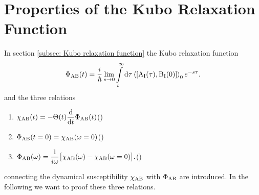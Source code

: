 %
%
\chapter{Properties of the Kubo Relaxation Function}
\label{app:properties of the Kubo relaxation function}
%
%
In section \ref{subsec: Kubo relaxation function} the Kubo relaxation function 
%
\begin{align}
	\Phi_{\mt{AB}}(t) = \frac{i}{\hbar} \lim\limits_{s \to 0} \int\limits_{t}^{\infty} \dd{\tau} \expval{\comm{\mt{A}_{\mt{I}}(\tau)}{\mt{B}_{\mt{I}}(0)}}_{0} e^{-s\tau}.
	\label{appeq: Kubo relaxation function}
\end{align}
%
and the three relations 
%
\begin{enumerate}
	\item $\begin{aligned}[t] \chi_{\mathrm{AB}}(t) = -\Theta(t) \dv{t} \Phi_{\mathrm{AB}}(t) \end{aligned}$\hfill {}(\theequation)\label{appeq: relation 1 between Phi and chi}
	\item $\begin{aligned}[t] \Phi_{\mathrm{AB}}(t = 0) = \chi_{\mathrm{AB}}(\omega = 0) \end{aligned}$\hfill {}(\theequation)\label{appeq: relation 2 between Phi and chi}
	\item $\begin{aligned}[t] \Phi_{\mathrm{AB}}(\omega) = \frac{1}{i\omega}\big[\chi_{\mathrm{AB}}(\omega) - \chi_{\mathrm{AB}}(\omega = 0)\big]. \end{aligned}$\hfill {}(\theequation)\label{appeq: relation 3 between Phi and chi}
\end{enumerate}
%
connecting the dynamical susceptibility $\chi_{\mathrm{AB}}$ with $\Phi_{\mathrm{AB}}$ are introduced.
In the following we want to proof these three relations.

